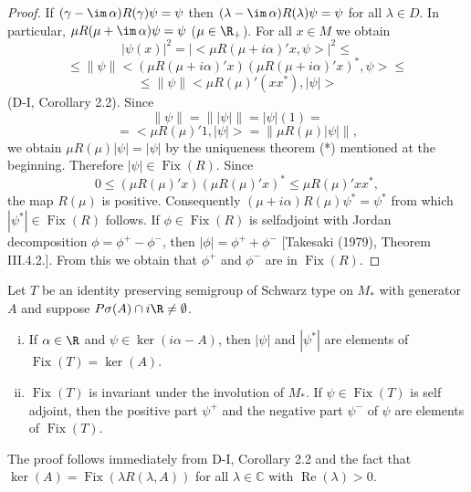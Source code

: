 
\begin{proof}
If $(\gamma - \im\,\alpha)R(\gamma)\psi = \psi$ then $(\lambda - \im\,\alpha)R(\lambda)\psi = \psi$ for all $\lambda \in D$.
In particular, $\mu R(\mu + \im\,\alpha)\psi = \psi$ ($\mu \in \R_+$).
For all $x \in M$ we obtain
\[
|\psi(x)|^2 = |<\mu R(\mu+i\alpha)'x,\psi>|^2 \leq
\]
\[
\leq \|\psi\| <(\mu R(\mu+i\alpha)'x)(\mu R(\mu+i\alpha)'x)^{*},\psi> \leq
\]
\[
\leq \|\psi\| <\mu R(\mu)'(xx^{*}),|\psi|>
\]
(D-I, Corollary 2.2).
Since
\[
\|\psi\| = \| |\psi| \| = |\psi|(1) =
\]
\[
= <\mu R(\mu)'1,|\psi|> = \| \mu R(\mu)|\psi| \|,
\]
we obtain $\mu R(\mu)|\psi| = |\psi|$ by the uniqueness theorem (*) mentioned at the beginning.
Therefore $|\psi| \in \operatorname{Fix}(R)$.
Since
\[
0 \leq (\mu R(\mu)'x)(\mu R(\mu)'x)^{*} \leq \mu R(\mu)'xx^{*},
\]
the map $R(\mu)$ is positive.
Consequently $(\mu+i\alpha)R(\mu)\psi^{*} = \psi^{*}$ from which $|\psi^{*}| \in \operatorname{Fix}(R)$ follows.
If $\phi \in \operatorname{Fix}(R)$ is selfadjoint with Jordan decomposition $\phi = \phi^+ - \phi^-$, then $|\phi| = \phi^+ + \phi^-$ [Takesaki (1979), Theorem III.4.2.].
From this we obtain that $\phi^+$ and $\phi^-$ are in $\operatorname{Fix}(R)$.
\end{proof}
\begin{corollary}\label{cor:d3-1.5}
Let $T$ be an identity preserving semigroup of Schwarz type on $M_*$ with generator $A$ and suppose $P\sigma(A) \cap i\R \neq \emptyset$.

\begin{enumerate}[(i)]
\item
If $\alpha \in \R$ and $\psi \in \operatorname{ker}(i\alpha - A)$, then $|\psi|$ and $|\psi^{*}|$ are elements of $\operatorname{Fix}(T) = \operatorname{ker}(A)$.

\item 
$\operatorname{Fix}(T)$ is invariant under the involution of $M_*$.
If $\psi \in \operatorname{Fix}(T)$ is self adjoint, then the positive part $\psi^+$ and the negative part $\psi^-$ of $\psi$ are elements of $\operatorname{Fix}(T)$.
\end{enumerate}

\end{corollary}
The proof follows immediately from D-I, Corollary 2.2 and the fact that $\operatorname{ker}(A) = \operatorname{Fix}(\lambda R(\lambda,A))$ for all $\lambda \in \mathbb{C}$ with $\operatorname{Re}(\lambda) > 0$.

